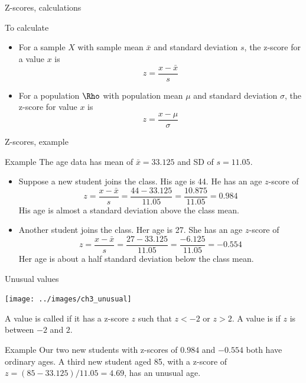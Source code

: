 \documentclass[xcolor=table, handout]{beamer}
\begin{document}
\begin{frame}{Z-scores, calculations}
\begin{exampleblock}{To calculate}
\begin{itemize}
\item For a sample $X$ with sample mean $\bar x$ and standard deviation $s$, the z-score for a value $x$ is
\[z = \frac{x - \bar x}{s}\]
\smallskip
\pause
\item For a population $\Rho$ with population mean $\mu$ and standard deviation $\sigma$, the z-score for value $x$ is
\[z = \frac{x - \mu}{\sigma}\]
\end{itemize} 
\end{exampleblock}
\end{frame}

\begin{frame}{Z-scores, example}
\begin{exampleblock}{Example}
The age data has mean of $\bar x = 33.125$ and SD of $s=11.05$.
\begin{itemize}
\pause
\item Suppose a new student joins the class. His age is 44. He has an age $z$-score of
\[z = \frac{x - \bar x}{s} = \frac {44-33.125}{11.05} = \frac {10.875}{11.05} = 0.984\]
\pause
His age is almost a standard deviation above the class mean.
\smallskip
\pause
\item Another student joins the class. Her age is 27. She has an age $z$-score of
\[z = \frac{x - \bar x}{s} = \frac {27-33.125}{11.05} = \frac {-6.125}{11.05} = -0.554\]
\pause
Her age is about a half standard deviation below the class mean.
\end{itemize}

\end{exampleblock}
\end{frame}

\begin{frame}{Unusual values}

{\centering
\texttt{[image: ../images/ch3\_unusual]} \par
}

\begin{block}{}
A value is called  if it has a z-score $z$ such that $z< -2$ or $z > 2$. A value is  if $z$ is between $-2$ and $2$.
\end{block}

\pause
\begin{exampleblock}{Example}
Our two new students with z-scores of $0.984$ and $-0.554$ both have ordinary ages. A third new student aged 85, with a z-score of $z = (85-33.125)/11.05 = 4.69$, has an unusual age.
\end{exampleblock}
\end{frame}
\end{document}
